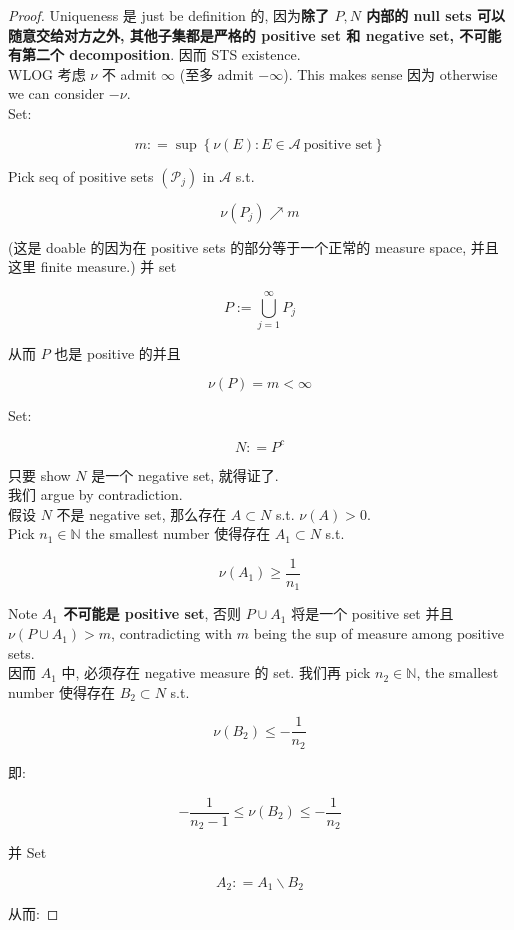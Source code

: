 \begin{proof}

Uniqueness 是 just be definition 的, 因为\textbf{除了 \(P,N\) 内部的 null sets 可以随意交给对方之外, 其他子集都是严格的 positive set 和 negative set, 不可能有第二个 decomposition}. 因而 STS existence.\\
WLOG 考虑 \(\nu\) 不 admit \(\infty\) (至多 admit \(- \infty\)). This makes sense 因为 otherwise we can consider \(- \nu\).\\
Set:

\[m: = \sup\left\{ {\nu(E):E \in \mathcal{A}\ \text{positive set}} \right\}\]

Pick seq of positive sets \((\mathcal{P}_{j})\) in \(\mathcal{A}\) s.t.

\[\nu(P_{j})\operatorname{\nearrow }m\]

(这是 doable 的因为在 positive sets 的部分等于一个正常的 measure space, 并且这里 finite measure.) 并 set

\[P := \bigcup\limits_{j = 1}^{\infty}P_{j}\]

从而 \(P\) 也是 positive 的并且

\[\nu(P) = m < \infty\]

Set:

\[N: = P^{c}\]

只要 show \(N\) 是一个 negative set, 就得证了.\\
我们 argue by contradiction.\\
假设 \(N\) 不是 negative set, 那么存在 \(A \subset N\) s.t. \(\nu(A) > 0\).\\
Pick \(n_{1} \in \mathbb{N}\) the smallest number 使得存在 \(A_{1} \subset N\) s.t.

\[\nu(A_{1}) \geq \frac{1}{n_{1}}\]

Note \textbf{\(A_{1}\) 不可能是 positive set}, 否则 \(P \cup A_{1}\) 将是一个 positive set 并且 \(\nu(P \cup A_{1}) > m\), contradicting with \(m\) being the sup of measure among positive sets.\\
因而 \(A_{1}\) 中, 必须存在 negative measure 的 set. 我们再 pick \(n_{2} \in \mathbb{N}\), the smallest number 使得存在 \(B_{2} \subset N\) s.t.

\[\nu(B_{2}) \leq - \frac{1}{n_{2}}\]

即:

\[- \frac{1}{n_{2} - 1} \leq \nu(B_{2}) \leq - \frac{1}{n_{2}}\]

并 Set

\[A_{2}: = A_{1}\backslash B_{2}\]

从而:


\end{proof}
